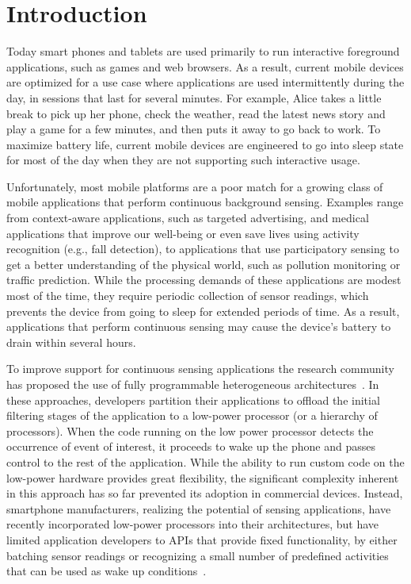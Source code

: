 
\section{\label{sec:Introduction}Introduction}

Today smart phones and tablets are used primarily to run interactive
foreground applications, such as games and web browsers.  As a result,
current mobile devices are optimized for a use case where applications
are used intermittently during the day, in sessions that last for
several minutes.  For example, Alice takes a little break to pick up
her phone, check the weather, read the latest news story and play a
game for a few minutes, and then puts it away to go back to work.  To
maximize battery life, current mobile devices are engineered to go
into sleep state for most of the day when they are not supporting
such interactive usage.

Unfortunately, most mobile platforms are a poor match for a growing
class of mobile applications that perform continuous background
sensing.  Examples range from context-aware applications, such as
targeted advertising, and medical applications that improve our
well-being or even save lives using activity recognition (e.g., fall
detection), to applications that use participatory sensing to get a
better understanding of the physical world, such as pollution
monitoring or traffic prediction.  While the processing demands of
these applications are modest most of the time, they require periodic
collection of sensor readings, which prevents the device from going to
sleep for extended periods of time.  As a result, applications that
perform continuous sensing may cause the device's battery to drain
within several hours.

To improve support for continuous sensing applications the research
community has proposed the use of fully programmable heterogeneous
architectures~\cite{reflex,turducken}.  In these approaches, developers
partition their applications to offload the initial filtering stages
of the application to a low-power processor (or a hierarchy of
processors).  When the code running on the low power processor detects
the occurrence of event of interest, it proceeds to wake up the phone
and passes control to the rest of the application.  While the ability
to run custom code on the low-power hardware provides great
flexibility, the significant complexity inherent in this approach has
so far prevented its adoption in commercial devices.  Instead,
smartphone manufacturers, realizing the potential of sensing
applications, have recently incorporated low-power processors into
their architectures, but have limited application developers to APIs
that provide fixed functionality, by either batching sensor readings
or recognizing a small number of predefined activities that can be
used as wake up conditions~\cite{android4.4,motox,nexus5}.

